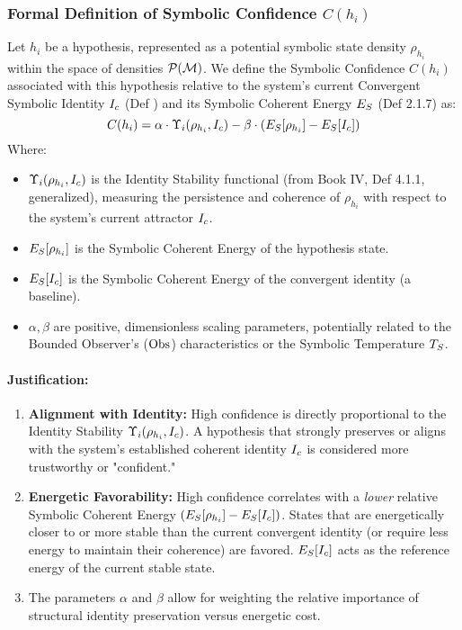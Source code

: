 \subsubsection{Formal Definition of Symbolic Confidence \(C(h_i)\)}
\label{subsubsec:bk7_formal_definition_of_symbolic_confidence_ch_i}
Let \(h_i\) be a hypothesis, represented as a potential symbolic state density \(\rho_{h_i}\) within the space of densities \(\mathcal{P}(\mathcal{M})\). We define the Symbolic Confidence \(C(h_i)\) associated with this hypothesis relative to the system's current Convergent Symbolic Identity \(I_c\) (Def ) and its Symbolic Coherent Energy \(E_S\) (Def 2.1.7) as:
\begin{equation}
C(h_i) = \alpha \cdot \Upsilon_i(\rho_{h_i}, I_c) - \beta \cdot (E_S[\rho_{h_i}] - E_S[I_c])
\end{equation}
Where:
\begin{itemize}
    \item \(\Upsilon_i(\rho_{h_i}, I_c)\) is the Identity Stability functional (from Book IV, Def 4.1.1, generalized), measuring the persistence and coherence of \(\rho_{h_i}\) with respect to the system's current attractor \(I_c\).
    \item \(E_S[\rho_{h_i}]\) is the Symbolic Coherent Energy of the hypothesis state.
    \item \(E_S[I_c]\) is the Symbolic Coherent Energy of the convergent identity (a baseline).
    \item \(\alpha, \beta\) are positive, dimensionless scaling parameters, potentially related to the Bounded Observer's ($\mathrm{Obs}$) characteristics or the Symbolic Temperature \(T_S\).
\end{itemize}
\paragraph{Justification:}
\begin{enumerate}
    \item \textbf{Alignment with Identity:} High confidence is directly proportional to the Identity Stability \(\Upsilon_i(\rho_{h_i}, I_c)\). A hypothesis that strongly preserves or aligns with the system's established coherent identity \(I_c\) is considered more trustworthy or "confident."
    \item \textbf{Energetic Favorability:} High confidence correlates with a \textit{lower} relative Symbolic Coherent Energy \((E_S[\rho_{h_i}] - E_S[I_c])\). States that are energetically closer to or more stable than the current convergent identity (or require less energy to maintain their coherence) are favored. \(E_S[I_c]\) acts as the reference energy of the current stable state.
    \item The parameters \(\alpha\) and \(\beta\) allow for weighting the relative importance of structural identity preservation versus energetic cost.
\end{enumerate}
